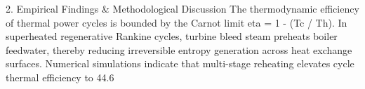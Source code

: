 2. Empirical Findings & Methodological Discussion
The thermodynamic efficiency of thermal power cycles is bounded by the Carnot limit eta = 1 - (Tc / Th). In superheated regenerative Rankine cycles, turbine bleed steam preheats boiler feedwater, thereby reducing irreversible entropy generation across heat exchange surfaces. Numerical simulations indicate that multi-stage reheating elevates cycle thermal efficiency to 44.6%